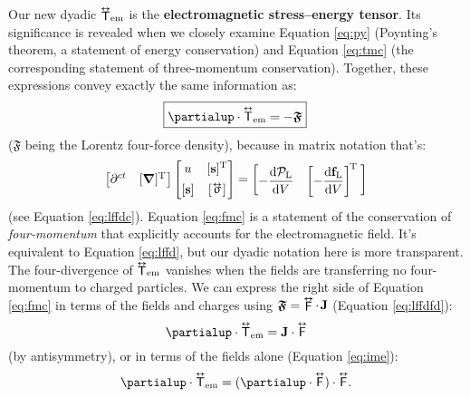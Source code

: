 \documentclass[12pt]{article}
\renewcommand{\vv}[1]{\mathbf{#1}}
\newcommand{\dd}[1]{\mathrm{d}#1}
\newcommand{\del}{\boldsymbol{\nabla}}
\newcommand{\tightoverset}[2]{%
  \mathop{#2}\limits^{\vbox to -.5ex{\kern-0.75ex\hbox{$#1$}\vss}}}
\newcommand{\inlinedy}[1]{\tightoverset{\text{\tiny$\bm\leftrightarrow$}}{#1}}
\newcommand{\capdy}[1]{ \overset{ \text{\tiny$\bm\leftrightarrow$} }{\vphantom{\text{\small{A}}}\smash{#1}} }
\begin{document}
Our new dyadic ${\inlinedy{\mathsf{T}}} _{\textrm{em}}$ is the \textbf{electromagnetic stress--energy tensor}. Its significance is revealed when we closely examine Equation \ref{eq:py} (Poynting's theorem, a statement of energy conservation) and Equation \ref{eq:tmc} (the corresponding statement of three-momentum conservation). Together, these expressions convey exactly the same information as:
\begin{equation}\label{eq:fmc}
\boxed{ \partialup \cdot \capdy{\mathsf{T}}_{\textrm{em}} = - \bm{\mathfrak{F}} } \,
\end{equation}
($\bm{\mathfrak{F}}$ being the Lorentz four-force density), because in matrix notation that's:
\begin{equation}\label{eq:fmcm}
\begin{bmatrix}
\partial^{ct} & [ \del ]^{\mathrm{T}} \mkern1mu
\end{bmatrix}
\begin{bmatrix}
u & [\vv s]^{\mathrm{T}} \\[1ex]
[\vv s] & [ \, \mkern-2mu \inlinedy{\upsigma} \mkern1mu ]
\end{bmatrix}
=
\begin{bmatrix}
- \dfrac{\dd \mathcal{P}_{\textrm{L}}}{\dd V} & \left[ - \dfrac{\dd \vv f_{\mathrm{L}}}{\dd V} \right] ^{\mkern-2mu \mathrm{T} \; }
\end{bmatrix}
\end{equation}
(see Equation \ref{eq:lffdc}). Equation \ref{eq:fmc} is a statement of the conservation of \emph{four-momentum} that explicitly accounts for the electromagnetic field. It's equivalent to Equation \ref{eq:lffd}, but our dyadic notation here is more transparent. The four-divergence of ${\inlinedy{\mathsf{T}}}_{\textrm{em}}$ vanishes when the fields are transferring no four-momentum to charged particles. We can express the right side of Equation \ref{eq:fmc} in terms of the fields and charges using $\bm{\mathfrak{F}} = \inlinedy{\mathsf{F}} \cdot \mkern2mu \vv J$ (Equation \ref{eq:lffdfd}):
\begin{equation*}
\partialup \cdot \capdy{\mathsf{T}}_{\textrm{em}} = \vv J \cdot \capdy{\mathsf{F}}
\end{equation*}
(by antisymmetry), or in terms of the fields alone (Equation \ref{eq:ime}):
\begin{equation*}
\partialup \cdot \capdy{\mathsf{T}}_{\textrm{em}} = ( \partialup \cdot \capdy{\mathsf{F}} ) \cdot \capdy{\mathsf{F}} .
\end{equation*}
\end{document}
